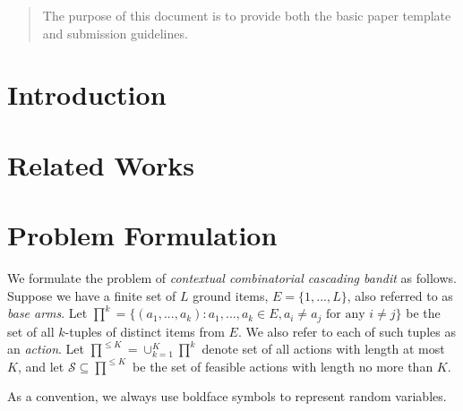 \documentclass{article}
\newcommand{\cS}{\mathcal{S}}
\begin{document}
 
	
	
\begin{abstract} 
The purpose of this document is to provide both the basic paper template and submission guidelines.
\end{abstract} 
	
\section{Introduction}
	
\section{Related Works}
	
\section{Problem Formulation}

We formulate the problem of {\em contextual combinatorial cascading bandit} as follows. Suppose we have a finite set of $L$ ground items,  $E=\{1,...,L\}$, also referred to as {\em base arms}. 
Let $\prod^k=\{(a_1,...,a_k): a_1,...,a_k \in E, a_i \neq a_j \text{ for any } i \neq j\}$ be the set of all $k$-tuples of distinct items from $E$. We also refer to each of such tuples as an {\em action}.
Let $\prod^{\leq K}= \cup_{k=1}^K \prod^{k}$ denote set of all actions with length
	at most $K$, and let $\cS \subseteq \prod^{\leq K}$ be the set of feasible actions with length no more than $K$. 

As a convention, we always use boldface symbols to represent random variables.
\end{document}
